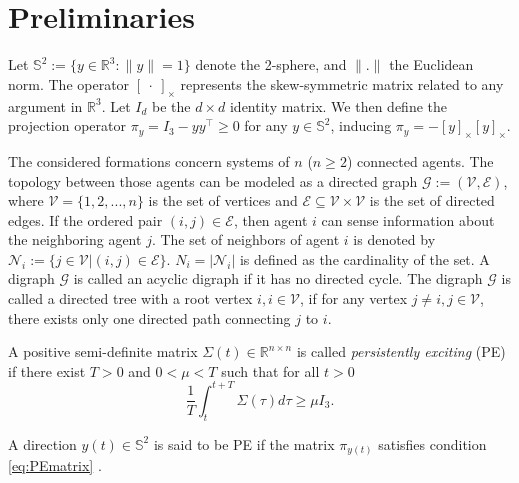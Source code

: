 \section{Preliminaries} \label{sec:preliminaries}

 Let $\mathbb{S}^2 := \{y\in \mathbb{R}^3 : \lVert y \rVert = 1 \}$ denote the 2-sphere, and $\lVert . \rVert$ the Euclidean norm. The operator $\begin{bmatrix} . \end{bmatrix}_\times$ represents the skew-symmetric matrix related to any argument in $\mathbb{R}^3$. Let $I_d$ be the $d\times d$ identity matrix. We then define the projection operator $\pi_y = I_3-yy^\top \geq 0$ for any $y\in\mathbb{S}^2$, inducing $\pi_y = -[y]_\times [y]_\times$.
 
The considered formations concern systems of $n$ ($n\geq2$) connected agents. The topology between those agents can be modeled as a directed graph $\mathcal{G} := (\mathcal{V},\mathcal{E})$, where $\mathcal{V}=\{1,2,...,n\}$ is the set of vertices and $\mathcal{E} \subseteq \mathcal{V} \times \mathcal{V}$ is the set of directed edges. If the ordered pair $(i,j) \in \mathcal{E}$, then agent $i$ can sense information about the neighboring agent $j$. The set of neighbors of agent $i$ is denoted by $\mathcal{N}_i := \{j \in \mathcal{V}|(i,j)\in \mathcal{E}\}$. $N_i = |\mathcal{N}_i|$ is defined as the cardinality of the set. A digraph $\mathcal{G}$ is called an acyclic digraph if it has no directed cycle. The digraph $\mathcal{G}$ is called a directed tree with a root vertex $i, i \in \mathcal{V}$, if for any vertex $j \neq i, j \in \mathcal{V}$, there exists only one directed path connecting $j$ to $i$. 

\begin{defi} \label{defi:PEmatrix}
    A positive semi-definite matrix $\Sigma(t) \in \mathbb{R}^{n \times n}$ is called \textit{persistently exciting} (PE) if there exist $T>0$ and $0<\mu<T$ such that for all $t>0$
    \begin{equation}
        \frac{1}{T}\int_t^{t+T}\Sigma(\tau)d\tau \geq \mu I_3.
        \label{eq:PEmatrix}
    \end{equation}
\end{defi}

\begin{defi} \label{defi:PEdirection}
     A direction $y(t)\in\mathbb{S}^2$ is said to be PE if the matrix $\pi_{y(t)}$ satisfies condition \eqref{eq:PEmatrix} \cite{tang2021formation}.
\end{defi}